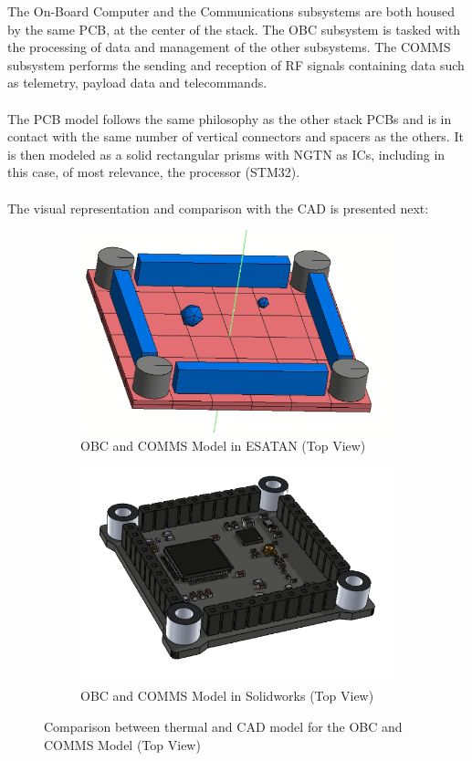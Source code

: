 The On-Board Computer and the Communications subsystems are both housed by the same PCB, at the center of the stack.
The OBC subsystem is tasked with the processing of data and management of the other subsystems. The COMMS
subsystem performs the sending and reception of RF signals containing data such as telemetry, payload data and
telecommands. 

\paragraph{}

The PCB model follows the same philosophy as the other stack PCBs and is in contact with the same number of vertical connectors and
spacers as the others. It is then modeled as a solid rectangular prisms with NGTN as ICs, including in this case, of most relevance,
the processor (STM32).

\paragraph{}

The visual representation and comparison with the CAD is presented next: 

\begin{figure}[H]
  \centering
  \begin{subfigure}{.5\textwidth}
    \centering
    \includegraphics[width=.6\linewidth]{res/img/5_simulationanalisys/Comparisons/ESATAN/OBC.PNG}
    \caption{OBC and COMMS Model in ESATAN (Top View)}
    \label{fig:obc}
  \end{subfigure}%
  \begin{subfigure}{.5\textwidth}
    \centering
    \includegraphics[width=.5\linewidth]{res/img/5_simulationanalisys/Comparisons/SLDW/OBC_Solid.PNG}
    \caption{OBC and COMMS Model in Solidworks (Top View)}
    \label{fig:obcsolid}
  \end{subfigure}
  \caption{Comparison between thermal and CAD model for the OBC and COMMS Model (Top View)}
  \label{fig:obcim}
\end{figure}

